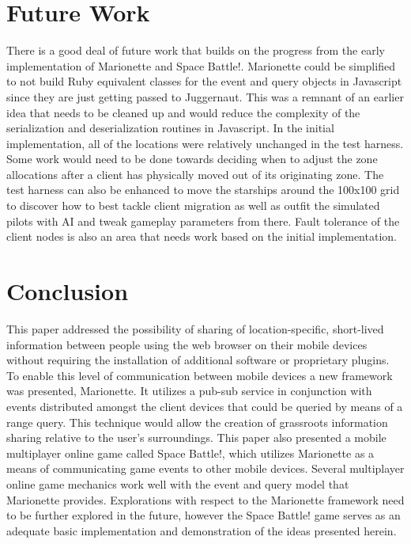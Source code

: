 \documentclass[12pt]{report}	%
\theoremstyle{definition}
\theoremstyle{remark}
\begin{document}
\chapter{Future Work}

There is a good deal of future work that builds on the progress from the
early implementation of Marionette and Space Battle!. Marionette could
be simplified to not build Ruby equivalent classes for the event and
query objects in Javascript since they are just getting passed to
Juggernaut. This was a remnant of an earlier idea that needs to be
cleaned up and would reduce the complexity of the serialization and
deserialization routines in Javascript. In the initial implementation,
all of the locations were relatively unchanged in the test harness. Some
work would need to be done towards deciding when to adjust the zone
allocations after a client has physically moved out of its originating
zone. The test harness can also be enhanced to move the starships around
the 100x100 grid to discover how to best tackle client migration as well
as outfit the simulated pilots with AI and tweak gameplay parameters
from there. Fault tolerance of the client nodes is also an area that
needs work based on the initial implementation.

\chapter{Conclusion}

This paper addressed the possibility of sharing of location-specific,
short-lived information between people using the web browser on their
mobile devices without requiring the installation of additional software
or proprietary plugins. To enable this level of communication between
mobile devices a new framework was presented, Marionette. It utilizes a
pub-sub service in conjunction with events distributed amongst the
client devices that could be queried by means of a range query. This
technique would allow the creation of grassroots information sharing
relative to the user's surroundings. This paper also presented a mobile
multiplayer online game called Space Battle!, which utilizes Marionette
as a means of communicating game events to other mobile devices. Several
multiplayer online game mechanics work well with the event and query
model that Marionette provides. Explorations with respect to the
Marionette framework need to be further explored in the future, however
the Space Battle! game serves as an adequate basic implementation and
demonstration of the ideas presented herein.
\end{document}

